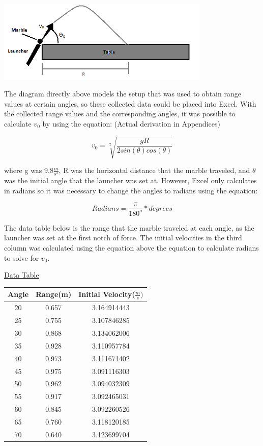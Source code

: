 \documentclass[aps,letterpaper,11pt]{revtex4}
\begin{document}
\begin{center}
\includegraphics[width=4in]{FindingVNaught.png}
\end{center}

The diagram directly above models the setup that was used to obtain range values at certain angles, so these collected data could be placed into Excel. With the collected range values and the corresponding angles, it was possible to calculate $v_0$ by using the equation: (Actual derivation in Appendices)

$$ v_0=\sqrt[2]{\frac{gR}{2sin(\theta)cos(\theta)}}$$ 


where g was 9.8$\frac{m}{s^2}$, R was the horizontal distance that the marble traveled, and $\theta$ was the initial angle that the launcher was set at. However, Excel only calculates in radians so it was necessary to change the angles to radians using the equation:

$$ Radians = \frac{\pi}{180^o}*degrees$$  

The data table below is the range that the marble traveled at each angle, as the launcher was set at the first notch of force. The initial velocities in the third column was calculated using the equation above the equation to calculate radians to solve for $v_0$. 

\begin{center}
\underline{Data Table}\\
\vspace{5mm}
\begin{tabular}{ |c|c|c| }
\hline
Angle & Range(m) & Initial Velocity($\frac{m}{s})$\\
\hline
20 & 0.657 & 3.164914443\\
\hline
25 & 0.755 & 3.107846285\\
\hline
30 & 0.868 & 3.134062006\\
\hline
35 & 0.928 & 3.110957784 \\
\hline
40 & 0.973 & 3.111671402\\
\hline
45 & 0.975 & 3.091116303\\
\hline
50 & 0.962 & 3.094032309\\
\hline
55 & 0.917 & 3.092465031\\
\hline
60 & 0.845 & 3.092260526\\
\hline
65 & 0.760 & 3.118120185\\
\hline
70 & 0.640 & 3.123699704\\
\hline
\end{tabular}
\end{center}
\end{document}
